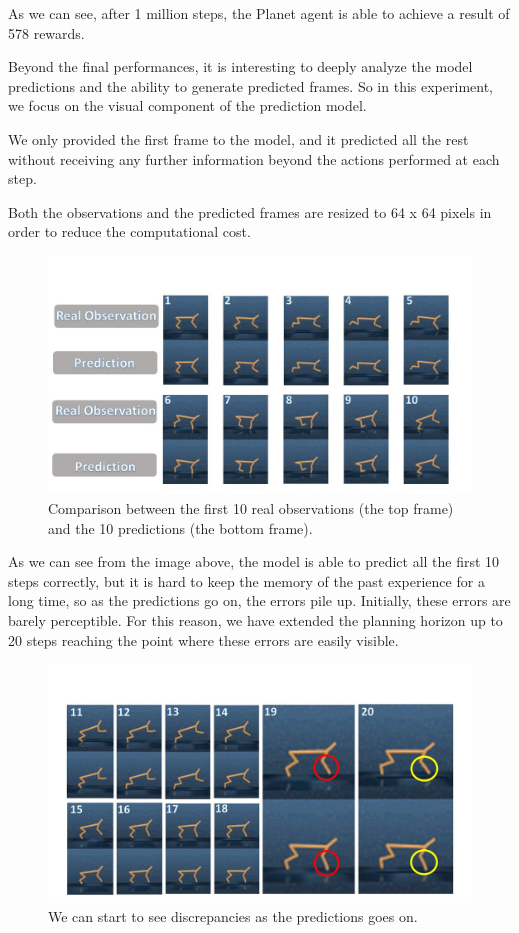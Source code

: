As we can see, after 1 million steps, the Planet agent is able to achieve a result of 578 rewards.


Beyond the final performances, it is interesting to deeply analyze the model predictions and the ability to generate predicted frames.
So in this experiment, we focus on the visual component of the prediction model.

We only provided the first frame to the model, and it predicted all the rest without receiving any further information beyond the actions performed at each step.

Both the observations and the predicted frames are resized to 64 x 64 pixels in order to reduce the computational cost. 

\begin{figure}[H]
\centering
\includegraphics[width=1. \textwidth, height=.35\textheight]{pictures/dump_plan_init}
\caption{ Comparison between the first 10 real observations (the top frame) and the 10 predictions (the bottom frame).}
\end{figure}

As we can see from the image above, the model is able to predict all the first 10 steps correctly, but it is hard to keep the memory of the past experience for a long time, so as the predictions go on, the errors pile up.
Initially, these errors are barely perceptible. For this reason, we have extended the planning horizon up to 20 steps reaching the point where these errors are easily visible.

\begin{figure}[H]
\centering
\includegraphics[width=1. \textwidth, height=.35\textheight]{pictures/dump_plan_finish}
\caption{ We can start to see discrepancies as the predictions goes on.}
\end{figure}

